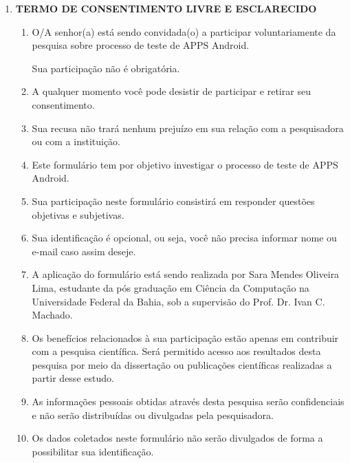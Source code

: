 \begin{enumerate}[label=\bf A\arabic*,leftmargin=1.8cm]

    \item \textbf{TERMO DE CONSENTIMENTO LIVRE E ESCLARECIDO}
    


    \begin{enumerate}[label= \arabic*]
    
        \item O/A senhor(a) está sendo convidada(o) a participar voluntariamente da pesquisa sobre processo de teste de \ac{APPS} Android.

        \iten Sua participação não é obrigatória.

        \item A qualquer momento você pode desistir de participar e retirar seu consentimento.

        \item Sua recusa não trará nenhum prejuízo em sua relação com a pesquisadora ou com a instituição.

        \item Este formulário tem por objetivo investigar o processo de teste de \ac{APPS} Android.

        \item Sua participação neste formulário consistirá em responder questões objetivas e subjetivas.
 
        \item Sua identificação é opcional, ou seja, você não precisa informar nome ou e-mail caso assim deseje.

        \item A aplicação do formulário está sendo realizada por Sara Mendes Oliveira Lima, estudante da pós graduação em Ciência da Computação na Universidade Federal da Bahia, sob a supervisão do Prof. Dr. Ivan C. Machado.

        \item Os benefícios relacionados à sua participação estão apenas em contribuir com a pesquisa científica. Será permitido acesso aos resultados desta pesquisa por meio da dissertação ou publicações científicas realizadas a partir desse estudo.

        \item As informações pessoais obtidas através desta pesquisa serão confidenciais e não serão distribuídas ou divulgadas pela pesquisadora.

        \item Os dados coletados neste formulário não serão divulgados de forma a possibilitar sua identificação.


\end{enumerate}
\end{enumerate}
